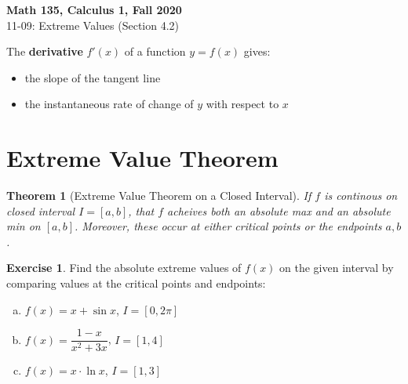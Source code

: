 \documentclass[11pt,reqno,final]{amsart}
\numberwithin{figure}{section}
\newtheorem{theorem}[equation]{Theorem}%
\theoremstyle{definition} %
\newtheorem{definition}[equation]{Definition}%
\newtheorem{example}[equation]{Example}%
\newtheorem{exercise}[question]{Exercise}
\begin{document}
\begin{center}
        \textbf{\Large Math 135, Calculus 1, Fall 2020}\\[10pt]
        {\large 11-09: Extreme Values (Section 4.2)}
\end{center}

\thispagestyle{empty}


\renewcommand{\thesection}{\Alph{section}}


The \textbf{derivative} $f'(x)$ of a function $y=f(x)$ gives:
\begin{itemize}
\item the slope of the tangent line
\item the instantaneous rate of change of $y$ with respect to $x$
\end{itemize}


\section{Extreme Value Theorem}




\begin{theorem}[Extreme Value Theorem on a Closed Interval]
        If $f$ is continous on closed interval $I = [a,b]$, that $f$ acheives both an absolute max and an absolute min on $[a,b]$.
        Moreover, these occur at either \textit{critical points} or the \textit{endpoints} $a,b$.
\end{theorem}

\begin{exercise}
        Find the absolute extreme values of $f(x)$ on the given interval
        by comparing values at the critical points and endpoints:
        \begin{enumerate}[(a)]                
        \item $f(x) = x + \sin x$, $I = [0, 2\pi]$
                \vfill
        \item $f(x) = \dfrac{1-x}{x^2+3x}$, $I = [1,4]$
                \vfill
        \item $f(x) = x \cdot \ln x$, $I = [1,3]$
                \vfill
        \end{enumerate}
\end{exercise}
\end{document}
